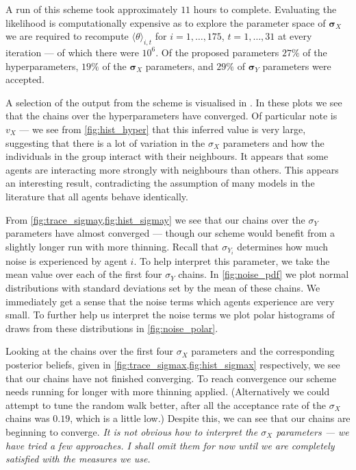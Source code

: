 A run of this scheme took approximately $11$ hours to complete. Evaluating the likelihood is computationally expensive as to explore the parameter space of $\bm{\sigma}_X$ we are required to recompute $\langle \theta \rangle_{i, t}$ for $i=1,\ldots,175$, $t=1,\ldots,31$ at every iteration --- of which there were $10^6$. Of the proposed parameters $27\%$ of the hyperparameters, $19\%$ of the $\bm{\sigma}_X$ parameters, and $29\%$ of $\bm{\sigma}_Y$ parameters were accepted.

A selection of the output from the scheme is visualised in . In these plots we see that the chains over the hyperparameters have converged. Of particular note is $v_X$ --- we see from \cref{fig:hist_hyper} that this inferred value is very large, suggesting that there is a lot of variation in the $\sigma_X$ parameters and how the individuals in the group interact with their neighbours. It appears that some agents are interacting more strongly with neighbours than others. This appears an interesting result, contradicting the assumption of many models in the literature that all agents behave identically.

From \cref{fig:trace_sigmay,fig:hist_sigmay} we see that our chains over the $\sigma_Y$ parameters have almost converged --- though our scheme would benefit from a slightly longer run with more thinning. Recall that $\sigma_{Y_i}$ determines how much noise is experienced by agent $i$. To help interpret this parameter, we take the mean value over each of the first four $\sigma_Y$ chains. In \cref{fig:noise_pdf} we plot normal distributions with standard deviations set by the mean of these chains. We immediately get a sense that the noise terms which agents experience are very small. To further help us interpret the noise terms we plot polar histograms of draws from these distributions in \cref{fig:noise_polar}.

Looking at the chains over the first four $\sigma_X$ parameters and the corresponding posterior beliefs, given in \cref{fig:trace_sigmax,fig:hist_sigmax} respectively, we see that our chains have not finished converging. To reach convergence our scheme needs running for longer with more thinning applied. (Alternatively we could attempt to tune the random walk better, after all the acceptance rate of the $\sigma_X$ chains was $0.19$, which is a little low.)  Despite this, we can see that our chains are beginning to converge. \emph{It is not obvious how to interpret the $\sigma_X$ parameters --- we have tried a few approaches. I shall omit them for now until we are completely satisfied with the measures we use.}

